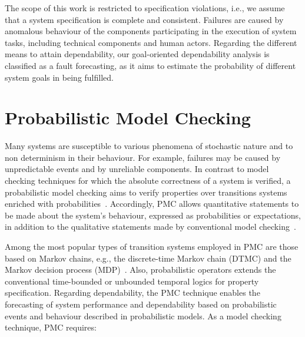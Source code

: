 The scope of this work is restricted to specification violations, i.e., we assume that a system specification is complete and consistent. Failures are caused by anomalous behaviour of the components participating in the execution of system tasks, including technical components and human actors. Regarding the different means to attain dependability, our goal-oriented dependability analysis is classified as a fault forecasting, as it aims to estimate the probability of different system goals in being fulfilled.








\section{Probabilistic Model Checking}


Many systems are susceptible to various phenomena of stochastic nature and to non determinism in their behaviour. For example, failures may be caused by unpredictable events and by unreliable components. In contrast to model checking techniques for which the absolute correctness of a system is verified, a probabilistic model checking aims to verify properties over transitions systems enriched with probabilities~\cite{Baier:2008}. Accordingly, PMC allows quantitative statements to be made about the system's behaviour, expressed as probabilities or expectations, in addition to the qualitative statements made by conventional model checking~\cite{Kwiatkowska:2012}.

Among the most popular types of transition systems employed in PMC are those based on Markov chains, e.g., the discrete-time Markov chain (DTMC) and the Markov decision process (MDP)~\cite{Kwiatkowska:2012}. Also, probabilistic operators extends the conventional time-bounded or unbounded temporal logics for property specification. Regarding dependability, the PMC technique enables the forecasting of system performance and dependability based on probabilistic events and behaviour described in probabilistic models. As a model checking technique, PMC requires:

